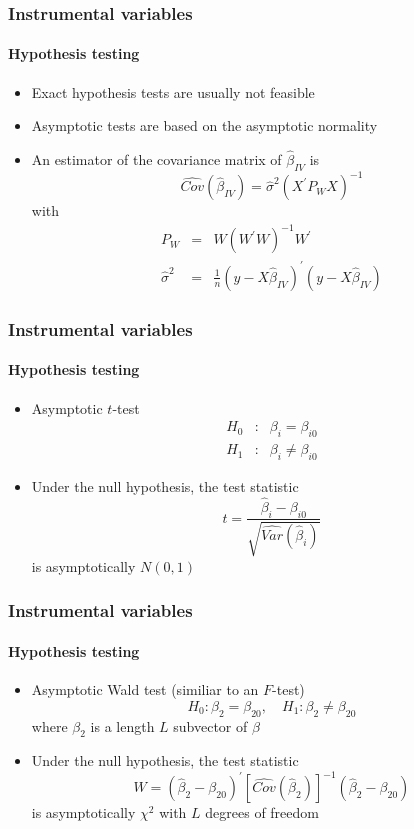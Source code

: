 \documentclass[notes=show]{beamer}
\begin{document}
\begin{frame}\frametitle{Instrumental variables}\framesubtitle{Hypothesis testing}
\begin{itemize}
    \item Exact hypothesis tests are usually not feasible
    \item Asymptotic tests are based on the asymptotic normality
    \item An estimator of the covariance matrix of $\hat{\beta}_{IV}$ is
    \begin{equation*}
        \widehat{Cov}\left( \hat{\beta}_{IV}\right) =\hat{\sigma}^{2}\left(X^{\prime }P_{W}X\right) ^{-1}
    \end{equation*}
    with
    \begin{eqnarray*}
        P_{W} &=&W\left( W^{\prime }W\right) ^{-1}W^{\prime } \\
        \hat{\sigma}^{2} &=&\frac{1}{n}\left( y-X\hat{\beta}_{IV}\right) ^{\prime}\left( y-X\hat{\beta}_{IV}\right)
    \end{eqnarray*}
\end{itemize}
\end{frame}


\begin{frame}\frametitle{Instrumental variables}\framesubtitle{Hypothesis testing}
\begin{itemize}
    \item Asymptotic $t$-test
    \begin{eqnarray*}
        H_{0} &:&\beta _{i}=\beta _{i0} \\
        H_{1} &:&\beta _{i}\neq \beta _{i0}
    \end{eqnarray*}
    \item Under the null hypothesis, the test statistic
    \begin{equation*}
        t=\frac{\hat{\beta}_{i}-\beta _{i0}}{\sqrt{\widehat{Var}\left( \hat{\beta}_{i}\right) }}
    \end{equation*}
    is asymptotically $N(0,1)$
\end{itemize}
\end{frame}


\begin{frame}\frametitle{Instrumental variables}\framesubtitle{Hypothesis testing}
\begin{itemize}
    \item Asymptotic Wald test (similiar to an $F$-test)
    \begin{equation*}
        H_{0}:\beta _{2}=\beta _{20},\quad H_{1}:\beta _{2}\neq \beta _{20}
    \end{equation*}
    where $\beta _{2}$ is a length $L$ subvector of $\beta $
    \item Under the null hypothesis, the test statistic
    \begin{equation*}
    W=\left( \hat{\beta}_{2}-\beta _{20}\right) ^{\prime }\left[ \widehat{Cov} \left( \hat{\beta}_{2}\right) \right] ^{-1}\left( \hat{\beta}_{2}-\beta_{20}\right)
    \end{equation*}
    is asymptotically $\chi ^{2}$ with $L$ degrees of freedom
\end{itemize}
\end{frame}
\end{document}
